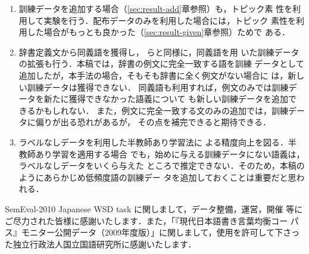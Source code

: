 \documentclass[japanese]{jnlp_1.4}
\begin{document}
\begin{enumerate}
  \item 訓練データを追加する場合（\ref{sec:result-add}章参照）も，トピック素
性を利用して実験を行う．配布データのみを利用した場合には，トピック
素性を利用した場合がもっとも良かった（\ref{sec:result-given}章参照）ためで
ある．

  \item 辞書定義文から同義語を獲得し，
\cite{Mihalcea:Moldovan:1999,Agirre:Martinez:2000}らと同様に，同義語を用
いた訓練データの拡張も行う．本稿では，辞書の例文に完全一致する語を訓練
データとして追加したが，本手法の場合，そもそも辞書に全く例文がない場合に
は，新しい訓練データは獲得できない．
同義語も利用すれば，例文のみでは訓練データを新たに獲得できなかった語義について
も新しい訓練データを追加できるかもしれない．
また，例文に完全一致する文のみの追加では，訓練データに偏りが出る恐れがあるが，
その点を補完できると期待できる．

\item 
ラベルなしデータを利用した半教師あり学習法\cite{Fujino:Ueda:Saito:2008}に
よる精度向上を図る．半教師あり学習を適用する場合
でも，始めに与える訓練データにない語義は，ラベルなしデータをいくら与えた
ところで推定できない．そのため，本稿のようにあらかじめ低頻度語の訓練デー
タを追加しておくことは重要だと思われる．
\end{enumerate}




\acknowledgment

SemEval-2010 Japanese WSD task に関しまして，データ整備，運営，開催
等にご尽力された皆様に感謝いたします．また，「『現代日本語書き言葉均衡コー
パス』モニター公開データ（2009年度版）」に関しまして，使用を許可して下さっ
た独立行政法人国立国語研究所に感謝いたします．
\end{document}
